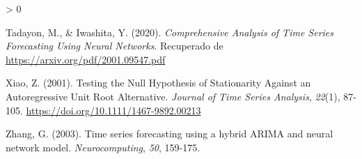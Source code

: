 \documentclass[
]{article}
\newlength{\cslhangindent}
\newenvironment{CSLReferences}[2] %
 {%
  \setlength{\parindent}{0pt}
  \ifodd #1 \everypar{\setlength{\hangindent}{\cslhangindent}}\ignorespaces\fi
  \ifnum #2 > 0
  \setlength{\parskip}{#2\baselineskip}
  \fi
 }%
 {}
\begin{document}
\begin{CSLReferences}{1}{0}
\leavevmode\hypertarget{ref-redes}{}%
Tadayon, M., \& Iwashita, Y. (2020). \emph{Comprehensive Analysis of
Time Series Forecasting Using Neural Networks}. Recuperado de
\url{https://arxiv.org/pdf/2001.09547.pdf}

\leavevmode\hypertarget{ref-doi:10.1111ux2f1467-9892.00213}{}%
Xiao, Z. (2001). Testing the Null Hypothesis of Stationarity Against an
Autoregressive Unit Root Alternative. \emph{Journal of Time Series
Analysis}, \emph{22}(1), 87-105.
\url{https://doi.org/10.1111/1467-9892.00213}

\leavevmode\hypertarget{ref-Zhang}{}%
Zhang, G. (2003). Time series forecasting using a hybrid ARIMA and
neural network model. \emph{Neurocomputing}, \emph{50}, 159-175.

\end{CSLReferences}
\end{document}
